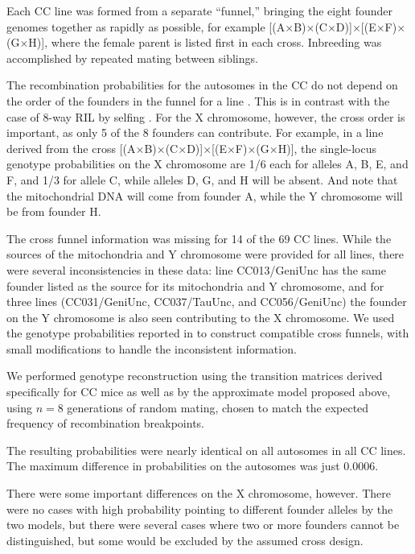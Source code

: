 \documentclass[12pt,letterpaper]{article}\usepackage[]{graphicx}\usepackage[table]{xcolor}
\begin{document}
Each CC line was formed from a separate ``funnel,'' bringing the
eight founder genomes together as rapidly as possible, for example
[(A$\times$B)$\times$(C$\times$D)]$\times$[(E$\times$F)$\times$(G$\times$H)],
where the female parent is listed first in each cross. Inbreeding was
accomplished by repeated mating between siblings.

The recombination probabilities for the autosomes in the CC do not
depend on the order of the founders in the funnel for a line
\citep{broman2005}. This is in contrast with the case of 8-way RIL by
selfing \citep[see][Table 2]{broman2005}. For the X chromosome,
however, the cross order is important, as only 5 of the 8 founders can
contribute. For example, in a line derived from the cross
[(A$\times$B)$\times$(C$\times$D)]$\times$[(E$\times$F)$\times$(G$\times$H)],
the single-locus genotype probabilities on the X chromosome are 1/6
each for alleles A, B, E, and F, and 1/3 for allele C, while alleles
D, G, and H will be absent. And note that the mitochondrial DNA will
come from founder A, while the Y chromosome will be from founder H.



The cross funnel information was missing for 14
of the 69 CC lines. While the sources of the
mitochondria and Y chromosome were provided for all lines, there were
several inconsistencies in these data: line CC013/GeniUnc has the
same founder listed as the source for its mitochondria and Y
chromosome, and for three lines
(CC031/GeniUnc, CC037/TauUnc, and CC056/GeniUnc) the founder on the Y chromosome is also
seen contributing to the X chromosome.
We used the genotype probabilities reported in
\citet{srivastava2017} to construct compatible cross funnels,
with small modifications to handle the inconsistent information.

We performed genotype reconstruction using the transition matrices
derived specifically for CC mice \citep{broman2005} as well as by the
approximate model proposed above, using $n=8$ generations of random
mating, chosen to match the expected frequency of recombination breakpoints.

The resulting probabilities were nearly identical on all autosomes in
all CC lines. The maximum difference in probabilities on the autosomes
was just 0.0006.

There were some important differences on the X chromosome, however.
There were no cases with high probability pointing to different
founder alleles by the two models, but there were several cases where
two or more founders cannot be distinguished, but some would be
excluded by the assumed cross design.
\end{document}
